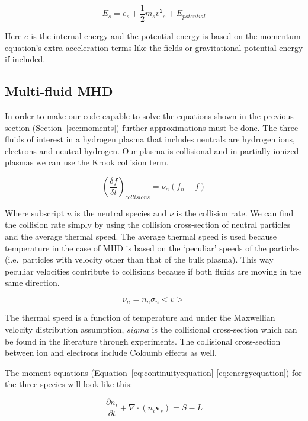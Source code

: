 \documentclass[12pt,upcase]{umlthesis}
\begin{document}
\begin{equation}\label{eq:energy}
	E_s = e_s + \frac{1}{2} m_s {v^2}_s + E_{potential}
\end{equation}

Here $e$ is the internal energy and the potential energy is based on the momentum equation's extra acceleration terms like the fields or gravitational potential energy if included.

\subsection{Multi-fluid MHD}\label{sec:multifluidmhd}

In order to make our code capable to solve the equations shown in the previous section (Section~\ref{sec:moments}) further approximations must be done. The three fluids of interest in a hydrogen plasma that includes neutrals are hydrogen ions, electrons and neutral hydrogen. Our plasma is collisional and in partially ionized plasmas we can use the Krook collision term.

\begin{equation}\label{eq:krook}
	{(\frac{\delta f}{\delta t})}_{collisions} = \nu_n (f_n - f)
\end{equation}

Where subscript $n$ is the neutral species and $\nu$ is the collision rate. We can find the collision rate simply by using the collision cross-section of neutral particles and the average thermal speed. The average thermal speed is used because temperature in the case of MHD is based on the `peculiar' speeds of the particles (i.e.\ particles with velocity other than that of the bulk plasma). This way peculiar velocities contribute to collisions because if both fluids are moving in the same direction.

\begin{equation}\label{eq:collisionrate}
	\nu_n = n_n \sigma_n <v>
\end{equation}

The thermal speed is a function of temperature and under the Maxwellian velocity distribution assumption, $sigma$ is the collisional cross-section which can be found in the literature through experiments. The collisional cross-section between ion and electrons include Coloumb effects as well.

The moment equations (Equation~\ref{eq:continuityequation}-\ref{eq:energyequation}) for the three species will look like this:

\begin{equation}\label{eq:icontinuity}
	\frac{\partial n_i}{\partial t} + \nabla \cdot (n_i \textbf{v}_s) = S - L
\end{equation}
\end{document}
